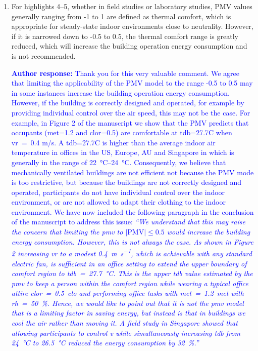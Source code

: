 \documentclass[a4paper, 10pt]{letter}
\newcommand{\response}[1]{\textcolor{blue}{\textbf{Author response:} #1}}
\begin{document}
\begin{letter}
\begin{enumerate}
            \item For highlights 4--5, whether in field studies or laboratory studies, PMV values generally ranging from -1 to 1 are defined as thermal comfort, which is appropriate for steady-state indoor environments close to neutrality.
            However, if it is narrowed down to -0.5 to 0.5, the thermal comfort range is greatly reduced, which will increase the building operation energy consumption and is not recommended.

            \response{
                Thank you for this very valuable comment.
                We agree that limiting the applicability of the PMV model to the range -0.5 to 0.5 may in some instances increase the building operation energy consumption.
                However, if the building is correctly designed and operated, for example by providing individual control over the air speed, this may not be the case.
                For example, in Figure 2 of the manuscript we show that the PMV predicts that occupants (met=1.2 and \ac{clor}=0.5) are comfortable at \ac{tdb}=27.7C when \ac{vr}~=~0.4 m/s.
                A \ac{tdb}=27.7C is higher than the average indoor air temperature in offices in the US, Europe, AU and Singapore in which is generally in the range of \qtyrange{22}{24}{\celsius}.
                Consequently, we believe that mechanically ventilated buildings are not efficient not because the PMV mode is too restrictive, but because the buildings are not correctly designed and operated, participants do not have individual control over the indoor environment, or are not allowed to adapt their clothing to the indoor environment.
                We have now included the following paragraph in the conclusion of the manuscript to address this issue: \textit{``We understand that this may raise the concern that limiting the \ac{pmv} to $\lvert \textrm{PMV}\lvert \leq 0.5$ would increase the building energy consumption.
                However, this is not always the case.
                As shown in Figure 2 increasing \ac{vr} to a modest \qty{0.4}{\m\per\s}, which is achievable with any standard electric fan, is sufficient in an office setting to extend the upper boundary of comfort region to \ac{tdb}~=~\qty{27.7}{\celsius}.
                This is the upper \ac{tdb} value estimated by the \ac{pmv} to keep a person within the comfort region while wearing a typical office attire \ac{clor}~=~\qty{0.5}{clo} and performing office tasks with \ac{met}~=~\qty{1.2}{met} with \ac{rh}~=~\qty{50}{\percent}.
                Hence, we would like to point out that it is not the \ac{pmv} model that is a limiting factor in saving energy, but instead is that in buildings we cool the air rather than moving it.
                A field study in Singapore showed that allowing participants to control \ac{v} while simultaneously increasing \ac{tdb} from \qty{24}{\celsius} to \qty{26.5}{\celsius} reduced the energy consumption by \qty{32}{\percent}.''}
            }


\end{enumerate}
\end{letter}
\end{document}
